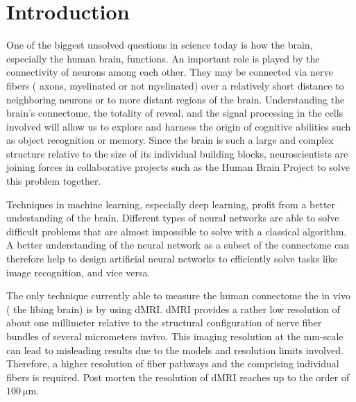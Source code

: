 % 
% 
% 
\cleardoublepage
% 
% 
% 
\setcounter{chapter}{0}
\chapter{Introduction}
\label{sec:intro}
% 
One of the biggest unsolved questions in science today is how the brain, especially the human brain, functions.
An important role is played by the connectivity of neurons among each other.
They may be connected via nerve fibers (\ie{} axons, myelinated or not myelinated) over a relatively short distance to neighboring neurons or to more distant regions of the brain.
Understanding the brain's connectome, \ie{} the totality of reveal, and the signal processing in the cells involved will allow us to explore and harness the origin of cognitive abilities such as object recognition or memory.
Since the brain is such a large and complex structure relative to the size of its individual building blocks, neuroscientists are joining forces in collaborative projects such as the Human Brain Project to solve this problem together. \cite{Markram2006, Shen2012, Amunts2013, Amunts2016}
\par
% 
Techniques in machine learning, especially deep learning, profit from a better undestanding of the brain.
Different types of neural networks are able to solve difficult problems that are almost impossible to solve with a classical algorithm.
A better understanding of the neural network as a subset of the connectome can therefore help to design artificial neural networks to efficiently solve tasks like image recognition, and vice versa. \cite{murphy2013machine, Goodfellow-et-al-2016}
\par
% 
The only technique currently able to measure the human connectome the in vivo (\ie{} the libing brain) is by using \ac{dMRI}.
\ac{dMRI} provides a rather low resolution of about one millimeter relative to the structural configuration of nerve fiber bundles of several micrometers invivo.
This imaging resolution at the \si{\milli\meter}-scale can lead to misleading results due to the models and resolution limits involved.
Therefore, a higher resolution of fiber pathways and the comprising individual fibers is required.
Post morten the resolution of \ac{dMRI} reaches up to the order of $\SI{100}{\micro\meter}$.
